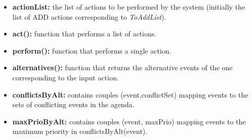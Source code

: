         \begin{itemize}
          \item \textbf{actionList:} the list of actions to be performed by the system (initially the list of ADD actions corresponding to \textit{ToAddList}).
          \item \textbf{act():} function that performs a list of actions.
          \item \textbf{perform():} function that performs a single action.
          \item \textbf{alternatives():} function that returns the alternative events of the one corresponding to the input action.
          \item \textbf{conflictsByAlt:} contains couples (event,conflictSet) mapping events to the sets of conflicting events in the agenda.
          \item \textbf{maxPrioByAlt:} contains couples (event, maxPrio) mapping events to the maximum priority in conflictsByAlt(event).
        \end{itemize}
			
